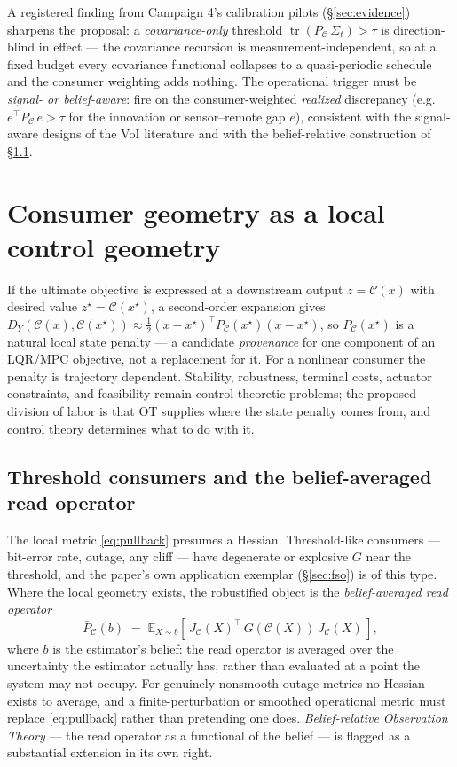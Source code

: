 \documentclass{article}
\theoremstyle{definition}
\theoremstyle{remark}
\newcommand{\E}{\mathbb{E}}
\newcommand{\PC}{P_{\mathcal{C}}}
\newcommand{\PCb}{\bar P_{\mathcal{C}}}
\newcommand{\tr}{\operatorname{tr}}
\newcommand{\C}{\mathcal{C}}
\newcommand{\Sig}{\Sigma}
\begin{document}
A registered finding from Campaign 4's calibration pilots
(\S\ref{sec:evidence}) sharpens the proposal: a \emph{covariance-only}
threshold $\tr(\PC\,\Sig_t)>\tau$ is direction-blind in effect --- the
covariance recursion is measurement-independent, so at a fixed budget every
covariance functional collapses to a quasi-periodic schedule and the
consumer weighting adds nothing. The operational trigger must be
\emph{signal- or belief-aware}: fire on the consumer-weighted \emph{realized}
discrepancy (e.g.\ $e^{\top}\PC\,e>\tau$ for the innovation or
sensor--remote gap $e$), consistent with the signal-aware designs of the VoI
literature and with the belief-relative construction of \S\ref{sec:belief}.

\section{Consumer geometry as a local control geometry}
\label{sec:control}

If the ultimate objective is expressed at a downstream output $z=\C(x)$ with
desired value $z^{\star}=\C(x^{\star})$, a second-order expansion gives
$D_Y(\C(x),\C(x^{\star}))\approx\tfrac12 (x-x^{\star})^{\top}
\PC(x^{\star})(x-x^{\star})$, so $\PC(x^{\star})$ is a natural local state
penalty --- a candidate \emph{provenance} for one component of an LQR/MPC
objective, not a replacement for it. For a nonlinear consumer the penalty is
trajectory dependent. Stability, robustness, terminal costs, actuator
constraints, and feasibility remain control-theoretic problems; the proposed
division of labor is that OT supplies where the state penalty comes from, and
control theory determines what to do with it.

\subsection{Threshold consumers and the belief-averaged read operator}
\label{sec:belief}

The local metric \eqref{eq:pullback} presumes a Hessian. Threshold-like
consumers --- bit-error rate, outage, any cliff --- have degenerate or
explosive $G$ near the threshold, and the paper's own application exemplar
(\S\ref{sec:fso}) is of this type. Where the local geometry exists, the
robustified object is the \emph{belief-averaged read operator}
\begin{equation}
\label{eq:beliefavg}
\PCb(b)\;=\;\E_{X\sim b}\!\left[\,J_\C(X)^{\top}\,G(\C(X))\,J_\C(X)\,\right],
\end{equation}
where $b$ is the estimator's belief: the read operator is averaged over the
uncertainty the estimator actually has, rather than evaluated at a point the
system may not occupy. For genuinely nonsmooth outage metrics no Hessian
exists to average, and a finite-perturbation or smoothed operational metric
must replace \eqref{eq:pullback} rather than pretending one does.
\emph{Belief-relative Observation Theory} --- the read operator as a
functional of the belief --- is flagged as a substantial extension in its own
right.
\end{document}
